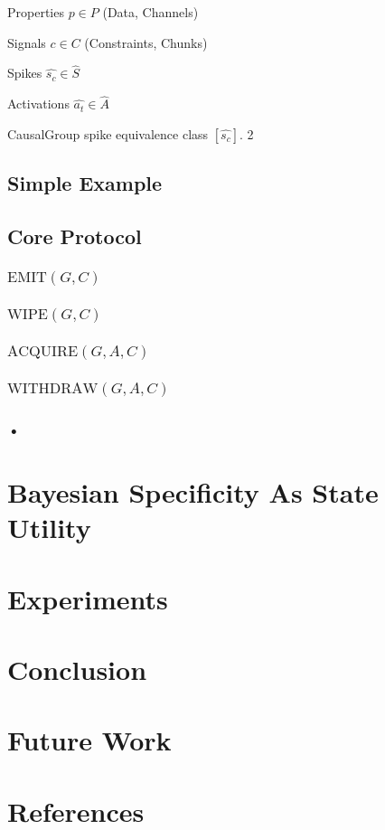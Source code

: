 \documentclass{article}
\begin{document}
Properties $p \in P$  (Data, Channels)

Signals $c \in C$ (Constraints, Chunks)

Spikes $\hat{s_c} \in \hat{S}$

Activations $\hat{a_t} \in \hat{A}$

CausalGroup spike equivalence class $[\hat{s_c}]$.
2
\subsection{Simple Example}

\subsection{Core Protocol}

\subsubsection{$\text{EMIT} (G,C)$}

\subsubsection{$\text{WIPE} (G,C)$}

\subsubsection{$\text{ACQUIRE} (G,A, C)$}

\subsubsection{$\text{WITHDRAW} (G,A, C)$}

\subsubsection{•}



\section{Bayesian Specificity As State Utility}


\section{Experiments}


\section{Conclusion}


\section{Future Work}


\section{References}
\end{document}
